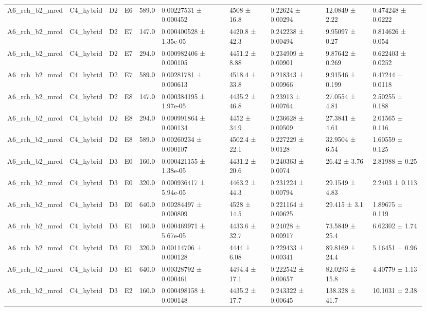 \begin{table}
\begin{tabular}{llllllllll}
A6\_rch\_b2\_mrcd & C4\_hybrid & D2 & E6 & 589.0 & 0.00227531 ± 0.000452 & 4508 ± 16.8 & 0.22624 ± 0.00294 & 12.0849 ± 2.22 & 0.474248 ± 0.0222 \\
A6\_rch\_b2\_mrcd & C4\_hybrid & D2 & E7 & 147.0 & 0.000400528 ± 1.35e-05 & 4420.8 ± 42.3 & 0.242238 ± 0.00494 & 9.95097 ± 0.27 & 0.814626 ± 0.054 \\
A6\_rch\_b2\_mrcd & C4\_hybrid & D2 & E7 & 294.0 & 0.000982406 ± 0.000105 & 4451.2 ± 8.88 & 0.234909 ± 0.00901 & 9.87642 ± 0.269 & 0.622403 ± 0.0252 \\
A6\_rch\_b2\_mrcd & C4\_hybrid & D2 & E7 & 589.0 & 0.00281781 ± 0.000613 & 4518.4 ± 33.8 & 0.218343 ± 0.00966 & 9.91546 ± 0.199 & 0.47244 ± 0.0118 \\
A6\_rch\_b2\_mrcd & C4\_hybrid & D2 & E8 & 147.0 & 0.000384195 ± 1.97e-05 & 4435.2 ± 46.8 & 0.23913 ± 0.00764 & 27.0554 ± 4.81 & 2.50255 ± 0.188 \\
A6\_rch\_b2\_mrcd & C4\_hybrid & D2 & E8 & 294.0 & 0.000991864 ± 0.000134 & 4452 ± 34.9 & 0.236628 ± 0.00509 & 27.3841 ± 4.61 & 2.01565 ± 0.116 \\
A6\_rch\_b2\_mrcd & C4\_hybrid & D2 & E8 & 589.0 & 0.00260234 ± 0.000107 & 4502.4 ± 22.1 & 0.227229 ± 0.0128 & 32.9504 ± 6.54 & 1.60559 ± 0.125 \\
A6\_rch\_b2\_mrcd & C4\_hybrid & D3 & E0 & 160.0 & 0.000421155 ± 1.38e-05 & 4431.2 ± 20.6 & 0.240363 ± 0.0074 & 26.42 ± 3.76 & 2.81988 ± 0.25 \\
A6\_rch\_b2\_mrcd & C4\_hybrid & D3 & E0 & 320.0 & 0.000936417 ± 5.94e-05 & 4463.2 ± 44.3 & 0.231224 ± 0.00794 & 29.1549 ± 4.83 & 2.2403 ± 0.113 \\
A6\_rch\_b2\_mrcd & C4\_hybrid & D3 & E0 & 640.0 & 0.00284497 ± 0.000809 & 4528 ± 14.5 & 0.221164 ± 0.00625 & 29.415 ± 3.1 & 1.89675 ± 0.119 \\
A6\_rch\_b2\_mrcd & C4\_hybrid & D3 & E1 & 160.0 & 0.000469971 ± 5.67e-05 & 4433.6 ± 32.7 & 0.24028 ± 0.00917 & 73.5849 ± 25.4 & 6.62302 ± 1.74 \\
A6\_rch\_b2\_mrcd & C4\_hybrid & D3 & E1 & 320.0 & 0.00114706 ± 0.000128 & 4444 ± 6.08 & 0.229433 ± 0.00341 & 89.8169 ± 24.4 & 5.16451 ± 0.96 \\
A6\_rch\_b2\_mrcd & C4\_hybrid & D3 & E1 & 640.0 & 0.00328792 ± 0.000461 & 4494.4 ± 17.1 & 0.222542 ± 0.00657 & 82.0293 ± 15.8 & 4.40779 ± 1.13 \\
A6\_rch\_b2\_mrcd & C4\_hybrid & D3 & E2 & 160.0 & 0.000498158 ± 0.000148 & 4435.2 ± 17.7 & 0.243322 ± 0.00645 & 138.328 ± 41.7 & 10.1031 ± 2.38 \\

\end{tabular}
\end{table}
